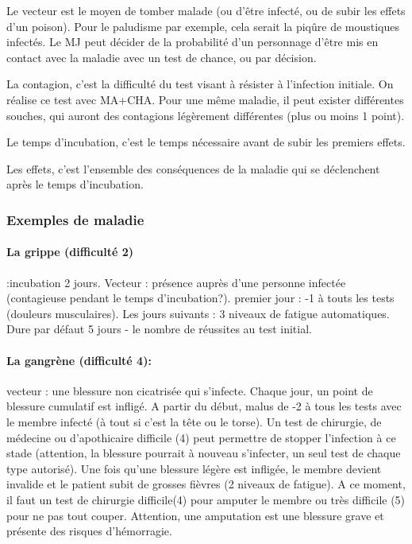 \documentclass[10pt,a4paper,twocolumn]{book}
\begin{document}
Le vecteur est le moyen de tomber malade (ou d'être infecté, ou de subir les effets d'un poison). Pour le paludisme par exemple, cela serait la piqûre de moustiques infectés. Le MJ peut décider de la probabilité d'un personnage d'être mis en contact avec la maladie avec un test de chance, ou par décision.

La contagion, c'est la difficulté du test visant à résister à l'infection initiale. On réalise ce test avec MA+CHA. Pour une même maladie, il peut exister différentes souches, qui auront des contagions légèrement différentes (plus ou moins 1 point).

Le temps d'incubation, c'est le temps nécessaire avant de subir les premiers effets.

Les effets, c'est l'ensemble des conséquences de la maladie qui se déclenchent après le temps d'incubation.

\subsubsection{Exemples de maladie}
\paragraph{La grippe (difficulté 2)} :incubation 2 jours. Vecteur : présence auprès d'une personne infectée (contagieuse pendant le temps d'incubation?). premier jour : -1 à touts les tests (douleurs musculaires). Les jours suivants : 3 niveaux de fatigue automatiques. Dure par défaut 5 jours - le nombre de réussites au test initial.
\paragraph{La gangrène (difficulté 4):} vecteur : une blessure non cicatrisée qui s'infecte. Chaque jour, un point de blessure cumulatif est infligé. A partir du début, malus de -2 à tous les tests avec le membre infecté (à tout si c'est la tête ou le torse). Un test de chirurgie, de médecine ou d'apothicaire difficile (4) peut permettre de stopper l'infection à ce stade (attention, la blessure pourrait à nouveau s'infecter, un seul test de chaque type autorisé). Une fois qu'une blessure légère est infligée, le membre devient invalide et le patient subit de grosses fièvres (2 niveaux de fatigue). A ce moment, il faut un test de chirurgie difficile(4) pour amputer le membre ou très difficile (5) pour ne pas tout couper. Attention, une amputation est une blessure grave et présente des risques d'hémorragie.
\end{document}

